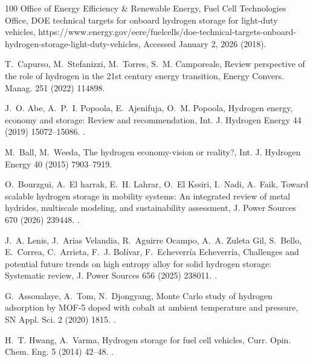 \documentclass[review]{elsarticle}
\begin{document}
\begin{thebibliography}{100}
{Office of Energy Efficiency \& Renewable Energy, Fuel Cell Technologies
  Office}, {DOE} technical targets for onboard hydrogen storage for light-duty
  vehicles,
  https://www.energy.gov/eere/fuelcells/doe-technical-targets-onboard-hydrogen-storage-light-duty-vehicles,
  {Accessed January 2, 2026} (2018).

T.~Capurso, M.~Stefanizzi, M.~Torres, S.~M. Camporeale, Review perspective of
  the role of hydrogen in the 21st century energy transition, Energy Convers.
  Manag. 251 (2022) 114898.

J.~O. Abe, A.~P.~I. Popoola, E.~Ajenifuja, O.~M. Popoola, Hydrogen energy,
  economy and storage: Review and recommendation, Int. J. Hydrogen Energy 44
  (2019) 15072--15086.
\newblock \href {https://doi.org/10.1016/j.ijhydene.2019.04.068}
  {}.

M.~Ball, M.~Weeda, The hydrogen economy-vision or reality?, Int. J. Hydrogen
  Energy 40 (2015) 7903--7919.

O.~Bourzgui, A.~{El harrak}, E.~H. Lahrar, O.~{El Kssiri}, I.~Nadi, A.~Faik,
  Toward scalable hydrogen storage in mobility systems: An integrated review of
  metal hydrides, multiscale modeling, and sustainability assessment, J. Power
  Sources 670 (2026) 239448.
\newblock \href {https://doi.org/10.1016/j.jpowsour.2026.239448}
  {}.

J.~A. Lenis, J.~{Arias Velandia}, R.~{Aguirre Ocampo}, A.~A. {Zuleta Gil},
  S.~Bello, E.~Correa, C.~Arrieta, F.~J. Bolívar, F.~{Echeverría
  Echeverría}, Challenges and potential future trends on high entropy alloy
  for solid hydrogen storage: Systematic review, J. Power Sources 656 (2025)
  238011.
\newblock \href {https://doi.org/10.1016/j.jpowsour.2025.238011}
  {}.

G.~Assoualaye, A.~Tom, N.~Djongyang, Monte {C}arlo study of hydrogen adsorption
  by {MOF-5} doped with cobalt at ambient temperature and pressure, SN Appl.
  Sci. 2 (2020) 1815.
\newblock \href {https://doi.org/10.1007/s42452-020-03627-9}
  {}.

H.~T. Hwang, A.~Varma, Hydrogen storage for fuel cell vehicles, Curr. Opin.
  Chem. Eng. 5 (2014) 42--48.
\newblock \href {https://doi.org/10.1016/j.coche.2014.04.004}
  {}.


\end{thebibliography}
\end{document}
